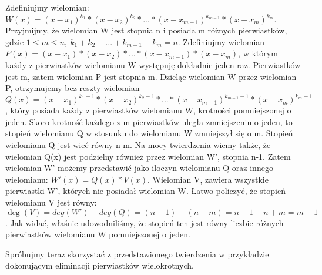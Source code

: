 \documentclass[twoside,a4paper]{book}
\newenvironment{proof}[1][Dowód]{\begin{trivlist}
\item[\hskip \labelsep {\bfseries #1}]}{\end{trivlist}}
\begin{document}
\begin{proof}
	Zdefiniujmy wielomian: $W(x)=(x-x_1)^{k_1}*(x-x_2)^{k_2}*...*(x-x_{m-1})^{k_{m-1}}*(x-x_m)^{k_m}$. Przyjmijmy, że wielomian W jest stopnia n i posiada m różnych pierwiastków, gdzie $1\le m\le n,\ k_1+k_2+...+k_{m-1}+k_m=n$. Zdefiniujmy wielomian $P(x)=(x-x_1)*(x-x_2)*...*(x-x_{m-1})*(x-x_m)$, w którym każdy z pierwiastków wielomianu W występuję dokładnie jeden raz. Pierwiastków jest m, zatem wielomian P jest stopnia m. Dzieląc wielomian W przez wielomian P, otrzymujemy bez reszty wielomian $Q(x)=(x-x_1)^{k_1-1}*(x-x_2)^{k_2-1}*...*(x-x_{m-1})^{k_{m-1}-1}*(x-x_m)^{k_m-1}$, który posiada każdy z pierwiastków wielomianu W, krotności pomniejszonej o jeden. Skoro krotność każdego z m pierwiastków uległa zmniejszeniu o jeden, to stopień wielomianu Q w stosunku do wielomianu W zmniejszył się o m. Stopień wielomianu Q jest wieć równy n-m.
	Na mocy twierdzenia wiemy także, że wielomian Q(x) jest podzielny również przez wielomian W', stopnia n-1. Zatem wielomian W' możemy przedstawić jako iloczyn wielomianu Q oraz innego wielomianu: $W'(x)=Q(x)*V(x)$. Wielomian V, zawiera wszystkie pierwiastki W', których nie posiadał wielomian W. Łatwo policzyć, że stopień wielomianu V jest równy: $\deg(V)=deg(W')-deg(Q)=(n-1)-(n-m)=n-1-n+m=m-1$. Jak widać, właśnie udowodniliśmy, że stopień ten jest równy liczbie różnych pierwiastków wielomianu W pomniejszonej o jeden.
\end{proof}

Spróbujmy teraz skorzystać z przedstawionego twierdzenia w przykładzie dokonującym eliminacji pierwiastków wielokrotnych.
\end{document}
